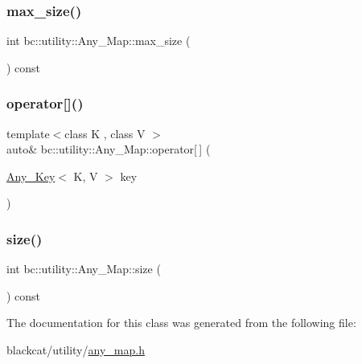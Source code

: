 \mbox{\label{classbc_1_1utility_1_1Any__Map_a69eeee0adc8cb8cdaeac754a7f81438c}} 
\subsubsection{\texorpdfstring{max\+\_\+size()}{max\_size()}}
{\footnotesize\ttfamily int bc\+::utility\+::\+Any\+\_\+\+Map\+::max\+\_\+size (\begin{DoxyParamCaption}{ }\end{DoxyParamCaption}) const\hspace{0.3cm}{\ttfamily [inline]}}

\mbox{\label{classbc_1_1utility_1_1Any__Map_a8898f0b7810c617631176e8bafbd156d}} 
\subsubsection{\texorpdfstring{operator[]()}{operator[]()}}
{\footnotesize\ttfamily template$<$class K , class V $>$ \\
auto\& bc\+::utility\+::\+Any\+\_\+\+Map\+::operator\mbox{[}$\,$\mbox{]} (\begin{DoxyParamCaption}\item[{\hyperlink{structbc_1_1utility_1_1Any__Key}{Any\+\_\+\+Key}$<$ K, V $>$}]{key }\end{DoxyParamCaption})\hspace{0.3cm}{\ttfamily [inline]}}

\mbox{\label{classbc_1_1utility_1_1Any__Map_afb04f91ca1a089ac61df93cb86d9b9f8}} 
\subsubsection{\texorpdfstring{size()}{size()}}
{\footnotesize\ttfamily int bc\+::utility\+::\+Any\+\_\+\+Map\+::size (\begin{DoxyParamCaption}{ }\end{DoxyParamCaption}) const\hspace{0.3cm}{\ttfamily [inline]}}



The documentation for this class was generated from the following file\+:\begin{DoxyCompactItemize}
\item 
blackcat/utility/\hyperlink{any__map_8h}{any\+\_\+map.\+h}\end{DoxyCompactItemize}
